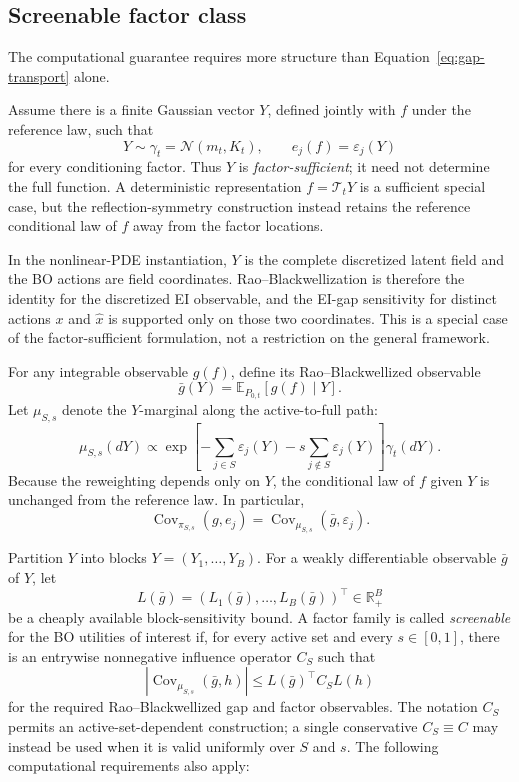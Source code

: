 \subsection{Screenable factor class}
\label{subsec:screenable}

The computational guarantee requires more structure than
Equation~\eqref{eq:gap-transport} alone.

Assume there is a finite Gaussian vector $Y$, defined jointly with $f$ under
the reference law, such that
\[
    Y\sim\gamma_t=\mathcal N(m_t,K_t),
    \qquad
    e_j(f)=\varepsilon_j(Y)
\]
for every conditioning factor.  Thus $Y$ is \emph{factor-sufficient}; it need
not determine the full function.  A deterministic representation
$f=\mathcal T_tY$ is a sufficient special case, but the reflection-symmetry
construction instead retains the reference conditional law of $f$ away from
the factor locations.

In the nonlinear-PDE instantiation, $Y$ is the complete discretized latent
field and the BO actions are field coordinates.  Rao--Blackwellization is
therefore the identity for the discretized EI observable, and the EI-gap
sensitivity for distinct actions $x$ and $\widehat x$ is supported only on
those two coordinates.  This is a special case of the factor-sufficient
formulation, not a restriction on the general framework.

For any integrable observable $g(f)$, define its Rao--Blackwellized observable
\[
    \bar g(Y)=\mathbb E_{P_{0,t}}[g(f)\mid Y].
\]
Let $\mu_{S,s}$ denote the $Y$-marginal along the active-to-full path:
\[
    \mu_{S,s}(dY)
    \propto
    \exp\!\left[-\sum_{j\in S}\varepsilon_j(Y)
                 -s\sum_{j\notin S}\varepsilon_j(Y)\right]\gamma_t(dY).
\]
Because the reweighting depends only on $Y$, the conditional law of $f$ given
$Y$ is unchanged from the reference law.  In particular,
\begin{equation}
    \operatorname{Cov}_{\pi_{S,s}}(g,e_j)
    =
    \operatorname{Cov}_{\mu_{S,s}}(\bar g,\varepsilon_j).
    \label{eq:rao-blackwell-covariance}
\end{equation}

Partition $Y$ into blocks $Y=(Y_1,\ldots,Y_B)$.  For a weakly differentiable
observable $\bar g$ of $Y$, let
\[
    L(\bar g)=(L_1(\bar g),\ldots,L_B(\bar g))^\top\in\mathbb R_+^B
\]
be a cheaply available block-sensitivity bound.  A factor family is called
\emph{screenable} for the BO utilities of interest if, for every active set and
every $s\in[0,1]$, there is an entrywise nonnegative influence operator $C_S$
such that
\begin{equation}
    \left|\operatorname{Cov}_{\mu_{S,s}}(\bar g,h)\right|
    \le L(\bar g)^\top C_S L(h)
    \label{eq:screenable-covariance}
\end{equation}
for the required Rao--Blackwellized gap and factor observables.  The notation
$C_S$ permits an active-set-dependent construction; a single conservative
$C_S\equiv C$ may instead be used when it is valid uniformly over $S$ and $s$.
The following computational requirements also apply:

